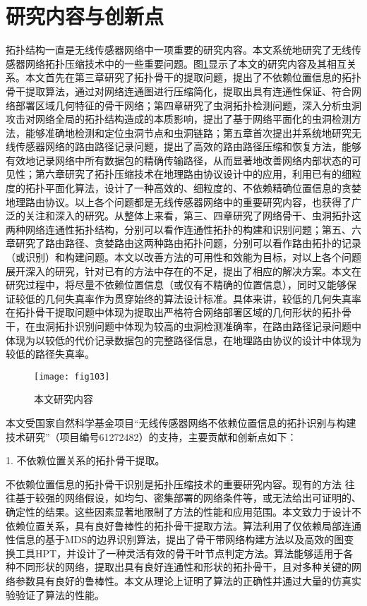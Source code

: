 \section{研究内容与创新点}
拓扑结构一直是无线传感器网络中一项重要的研究内容。本文系统地研究了无线传感器网络拓扑压缩技术中的一些重要问题。图\ref{fig:103}显示了本文的研究内容及其相互关系。本文首先在第三章研究了拓扑骨干的提取问题，提出了不依赖位置信息的拓扑骨干提取算法，通过对网络连通图进行压缩简化，提取出具有连通性保证、符合网络部署区域几何特征的骨干网络；第四章研究了虫洞拓扑检测问题，深入分析虫洞攻击对网络全局的拓扑结构造成的本质影响，提出了基于网络平面化的虫洞检测方法，能够准确地检测和定位虫洞节点和虫洞链路；第五章首次提出并系统地研究无线传感器网络的路由路径记录问题，提出了高效的路由路径压缩和恢复方法，能够有效地记录网络中所有数据包的精确传输路径，从而显著地改善网络内部状态的可见性；第六章研究了拓扑压缩技术在地理路由协议设计中的应用，利用已有的细粒度的拓扑平面化算法，设计了一种高效的、细粒度的、不依赖精确位置信息的贪婪地理路由协议。以上各个问题都是无线传感器网络中的重要研究内容，也获得了广泛的关注和深入的研究。从整体上来看，第三、四章研究了网络骨干、虫洞拓扑这两种网络连通性拓扑结构，分别可以看作连通性拓扑的构建和识别问题；第五、六章研究了路由路径、贪婪路由这两种路由拓扑问题，分别可以看作路由拓扑的记录（或识别）和构建问题。本文以改善方法的可用性和效能为目标，对以上各个问题展开深入的研究，针对已有的方法中存在的不足，提出了相应的解决方案。本文在研究过程中，将尽量不依赖位置信息（或仅有不精确的位置信息），同时又能够保证较低的几何失真率作为贯穿始终的算法设计标准。具体来讲，较低的几何失真率在拓扑骨干提取问题中体现为提取出严格符合网络部署区域的几何形状的拓扑骨干，在虫洞拓扑识别问题中体现为较高的虫洞检测准确率，在路由路径记录问题中体现为以较低的代价记录数据包的完整路径信息，在地理路由协议的设计中体现为较低的路径失真率。
\begin{figure}[t] %
  \centering
  \texttt{[image: fig103]}
  \caption{本文研究内容}
  \label{fig:103}
\end{figure}

本文受国家自然科学基金项目“无线传感器网络不依赖位置信息的拓扑识别与构建技术研究”（项目编号61272482）的支持，主要贡献和创新点如下：

1. 不依赖位置关系的拓扑骨干提取。

不依赖位置信息的拓扑骨干识别是拓扑压缩技术的重要研究内容。现有的方法 往往基于较强的网络假设，如均匀、密集部署的网络条件等，或无法给出可证明的、确定性的结果。这些因素显著地限制了方法的性能和应用范围。本文致力于设计不依赖位置关系，具有良好鲁棒性的拓扑骨干提取方法。算法利用了仅依赖局部连通性信息的基于MDS的边界识别算法，提出了骨干带网络构建方法以及高效的图变换工具HPT，并设计了一种灵活有效的骨干叶节点判定方法。算法能够适用于各种不同形状的网络，提取出具有良好连通性和形状的拓扑骨干，且对多种关键的网络参数具有良好的鲁棒性。本文从理论上证明了算法的正确性并通过大量的仿真实验验证了算法的性能。

